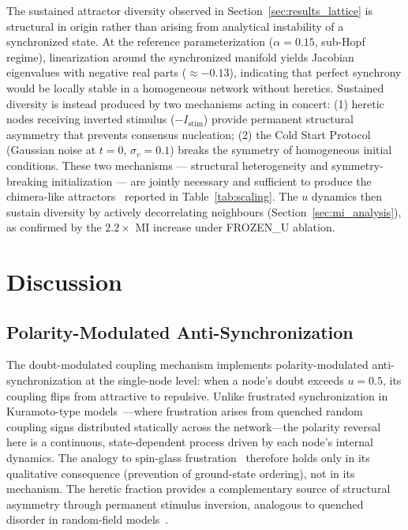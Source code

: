 \documentclass[11pt]{article}
\begin{document}
The sustained attractor diversity observed in Section~\ref{sec:results_lattice} is structural in origin rather than arising from analytical instability of a synchronized state. At the reference parameterization ($\alpha = 0.15$, sub-Hopf regime), linearization around the synchronized manifold yields Jacobian eigenvalues with negative real parts ($\approx -0.13$), indicating that perfect synchrony would be locally stable in a homogeneous network without heretics. Sustained diversity is instead produced by two mechanisms acting in concert: (1) heretic nodes receiving inverted stimulus ($-I_{\text{stim}}$) provide permanent structural asymmetry that prevents consensus nucleation; (2) the Cold Start Protocol (Gaussian noise at $t=0$, $\sigma_v = 0.1$) breaks the symmetry of homogeneous initial conditions. These two mechanisms — structural heterogeneity and symmetry-breaking initialization — are jointly necessary and sufficient to produce the chimera-like attractors~\cite{abrams2004} reported in Table~\ref{tab:scaling}. The $u$ dynamics then sustain diversity by actively decorrelating neighbours (Section~\ref{sec:mi_analysis}), as confirmed by the $2.2\times$ MI increase under FROZEN\_U ablation.

\section{Discussion}
\label{sec:discussion}

\subsection{Polarity-Modulated Anti-Synchronization}

The doubt-modulated coupling mechanism implements polarity-modulated anti-synchronization at the single-node level: when a node's doubt exceeds $u = 0.5$, its coupling flips from attractive to repulsive. Unlike frustrated synchronization in Kuramoto-type models~\cite{odor2024}---where frustration arises from quenched random coupling signs distributed statically across the network---the polarity reversal here is a continuous, state-dependent process driven by each node's internal dynamics. The analogy to spin-glass frustration~\cite{toulouse1977} therefore holds only in its qualitative consequence (prevention of ground-state ordering), not in its mechanism. The heretic fraction provides a complementary source of structural asymmetry through permanent stimulus inversion, analogous to quenched disorder in random-field models~\cite{nattermann1998}.
\end{document}
